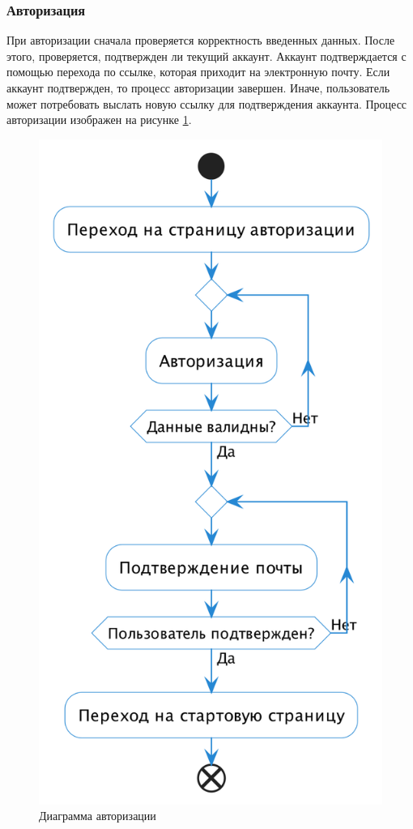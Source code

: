 \documentclass[a4paper,14pt]{extarticle}
\begin{document}
\subsubsection*{Авторизация}

При авторизации сначала проверяется корректность введенных данных. После этого, проверяется, подтвержден ли текущий аккаунт. Аккаунт подтверждается с помощью перехода по ссылке, которая приходит на электронную почту. Если аккаунт подтвержден, то процесс авторизации завершен. Иначе, пользователь может потребовать выслать новую ссылку для подтверждения аккаунта. Процесс авторизации изображен на рисунке \ref{fig:auth}.

\begin{figure}[H]
    \centering
    \includegraphics[height=0.5\textheight]{images/auth.png}
    \caption{Диаграмма авторизации}
    \label{fig:auth}
\end{figure}
\end{document}
